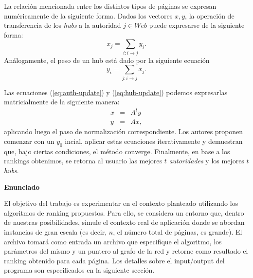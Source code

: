 \documentclass[11pt, a4paper]{article}
\begin{document}
La relaci\'on mencionada entre los distintos tipos de p\'aginas se expresan num\'ericamente de la siguiente forma. Dados los
vectores $x,y$, la operaci\'on de transferencia de los \emph{hubs} a la autoridad $j \in Web$ puede expresarse de la siguiente forma:
\begin{equation}
x_j = \sum_{i: i \to j} y_i. \label{eq:auth-update}
\end{equation}
An\'alogamente, el peso de un hub est\'a dado por la siguiente ecuaci\'on
\begin{equation}
y_i = \sum_{j: i \to j} x_j. \label{eq:hub-update}
\end{equation}

Las ecuaciones (\ref{eq:auth-update}) y (\ref{eq:hub-update}) podemos expresarlas matricialmente de la siguiente manera:
\begin{eqnarray}
x & = & A^ty \label{eq:auth-update-math} \\
y & = & Ax, \label{eq:hub-update-math} 
\end{eqnarray}
aplicando luego el paso de normalizaci\'on correspondiente. Los autores proponen comenzar con un $y_0$ incial, aplicar estas ecuaciones 
iterativamente y demuestran que, bajo ciertas condiciones, el m\'etodo converge. Finalmente, en base a los rankings obtenimos, se retorna
al usuario las mejores $t$ \emph{autoridades} y los mejores $t$ \emph{hubs}.

\vskip 5pt
\noindent\textbf{Enunciado}
\vskip 5pt

El objetivo del trabajo es experimentar en el contexto planteado utilizando los algoritmos de ranking propuestos. Para ello, se considera
un entorno que, dentro de nuestras posibilidades, simule el contexto real de aplicaci\'on donde se abordan instancias de gran escala (es
decir, $n$, el n\'umero total de p\'aginas, es grande). El archivo tomar\'a como entrada un archivo que especifique el algoritmo, los
par\'ametros del mismo y un puntero al grafo de la red y retorne como resultado el ranking obtenido para cada p\'agina. Los detalles sobre 
el input/output del programa son especificados en la siguiente secci\'on.
\end{document}
